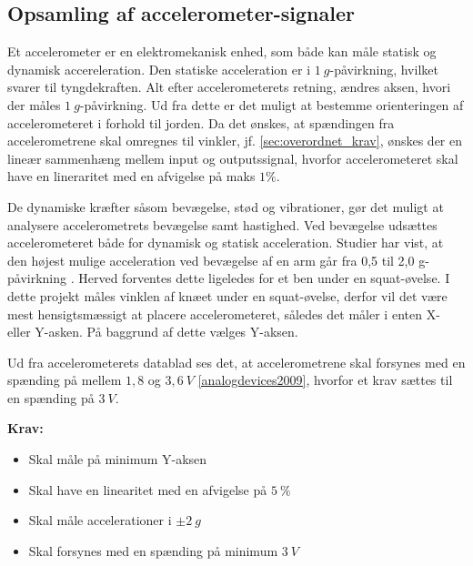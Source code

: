 \subsection{Opsamling af accelerometer-signaler} \label{sec:acc_teori}
Et accelerometer er en elektromekanisk enhed, som både kan måle statisk og dynamisk accereleration. Den statiske acceleration er i $1~g$-påvirkning, hvilket svarer til tyngdekraften. Alt efter accelerometerets retning, ændres aksen, hvori der måles $1~g$-påvirkning. Ud fra dette er det muligt at bestemme orienteringen af accelerometeret i forhold til jorden. Da det ønskes, at spændingen fra accelerometrene skal omregnes til vinkler, jf. \autoref{sec:overordnet_krav}, ønskes der en lineær sammenhæng mellem input og outputssignal, hvorfor accelerometeret skal have en lineraritet med en afvigelse på maks $1\%$. 

De dynamiske kræfter såsom bevægelse, stød og vibrationer, gør det muligt at analysere accelerometrets bevægelse samt hastighed. Ved bevægelse udsættes accelerometeret både for dynamisk og statisk acceleration. Studier har vist, at den højest mulige acceleration ved bevægelse af en arm går fra 0,5 til 2,0 g-påvirkning \citep{bernmarka2002}. Herved forventes dette ligeledes for et ben under en squat-øvelse. I dette projekt måles vinklen af knæet under en squat-øvelse, derfor vil det være mest hensigtsmæssigt at placere accelerometeret, således det måler i enten X- eller Y-asken. På baggrund af dette vælges Y-aksen.

Ud fra accelerometerets datablad ses det, at accelerometrene skal forsynes med en spænding på mellem $1,8$ og $3,6~V$ \autoref{analogdevices2009}, hvorfor et krav sættes til en spænding på $3~V$.

\vspace{3mm}
\textbf{Krav:}
\begin{itemize}
\item Skal måle på minimum Y-aksen
\item Skal have en linearitet med en afvigelse på $5~\%$
\item Skal måle accelerationer i $\pm 2~g$
\item Skal forsynes med en spænding på minimum $3~V$
\end{itemize}